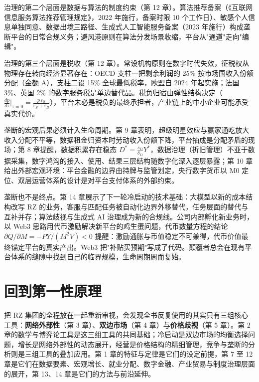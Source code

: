 治理的第二个层面是数据与算法的制度约束（第 12 章）。算法推荐备案（《互联网信息服务算法推荐管理规定》，2022 年施行，备案时限 10 个工作日）、敏感个人信息单独同意、数据出境三路径、生成式人工智能服务备案（2023 年施行）构成垄断平台的日常合规义务；避风港原则在算法分发场景收缩，平台从"通道"走向"编辑"。

治理的第三个层面是税收（第 12 章）。常设机构原则在数字时代失效，征税权从物理存在转向经济显著存在：OECD 支柱一把剩余利润的 25\% 按市场国收入份额分配（金额 A），支柱二设 15\% 全球最低税率，欧盟自 2024 年起实施；法国 3\%、英国 2\% 的数字服务税是单边替代品。税负归宿由弹性结构决定（$\frac{dp}{d\tau}|_{\tau=0}=\frac{p\,\varepsilon_S}{\varepsilon_S+\varepsilon_D}$），平台未必是税负的最终承担者，产业链上的中小企业可能承受真实代价。

垄断的宏观后果必须计入生命周期。第 9 章表明，超级明星效应与赢家通吃放大收入分配不平等，数据租金归资本时劳动收入份额下降，平台抽成是分配矛盾的现场；第 8 章提醒，数据积累存在稳态 $D^{*}=\frac{s_D}{\delta_D}Y^{*}$，数据治理（折旧管理）不亚于数据采集，数字鸿沟的接入、使用、结果三层结构随数字化深入逐层暴露；第 10 章给出外部宏观环境：平台金融的边界由持牌与监管划定，央行数字货币以 M0 定位、双层运营体系的设计是对平台支付体系的外部约束。

垄断也不是终点。第 14 章展示了下一轮冷启动的技术基础：大模型以新的成本结构改写 RZ 的业务，客服与匹配任务被自动化边界外移替代，任务层面的替代与互补并存；算法歧视与生成式 AI 治理成为新的合规线。公司内部孵化新业务时，以 Web3 思路用代币激励解决新平台的鸡生蛋问题，代币数量方程的结论 $\partial Q/\partial M=-PY/(M^2V)<0$ 提醒：激励通胀与币值稳定不可兼得，代币价值最终锚定平台的真实产出。Web3 把"补贴买预期"写成了代码。颠覆者总会在现有平台体系的缝隙中找到自己的临界规模，生命周期周而复始。

\section{回到第一性原理}

把 RZ 集团的全程放在一起重新审视，会发现全书反复使用的其实只有三组核心工具：\textbf{网络外部性}（第 3 章）、\textbf{双边市场}（第 4 章）与\textbf{价格歧视}（第 5 章）。第 2 章的数学与博弈论工具是这三组工具的共同基础；冷启动是双边市场的均衡选择问题，增长是网络外部性的动态展开，经营是价格结构的精细管理，竞争与垄断的分析则是三组工具的叠加应用。第 1 章的特征与定律是它们的设定前提，第 7 至 12 章是它们在数据要素、宏观增长、就业分配、数字金融、产业贸易与制度治理层面的展开，第 13、14 章是它们的方法与前沿延伸。

